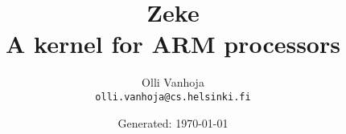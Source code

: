 \documentclass[11pt,oneside,a4paper]{book}
\title{%
  Zeke\\
  A kernel for ARM processors
}
\author{%
  Olli Vanhoja\\
  \texttt{olli.vanhoja@cs.helsinki.fi}
}
\date{%
Generated: \today
}
\begin{document}
  \maketitle
  \tableofcontents

  
  
  
  
  
  
  
  
  

  {}
  
\end{document}
